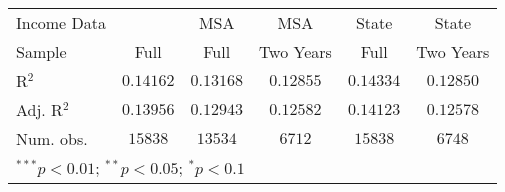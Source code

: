 \begin{tabular}{l c c c c c}
Income Data          &                  & MSA              & MSA             & State            & State           \\
Sample               & Full             & Full             & Two Years       & Full             & Two Years       \\
R$^2$                & $0.14162$        & $0.13168$        & $0.12855$       & $0.14334$        & $0.12850$       \\
Adj. R$^2$           & $0.13956$        & $0.12943$        & $0.12582$       & $0.14123$        & $0.12578$       \\
Num. obs.            & $15838$          & $13534$          & $6712$          & $15838$          & $6748$          \\
\hline
\multicolumn{6}{l}{\scriptsize{$^{***}p<0.01$; $^{**}p<0.05$; $^{*}p<0.1$}}
\end{tabular}

